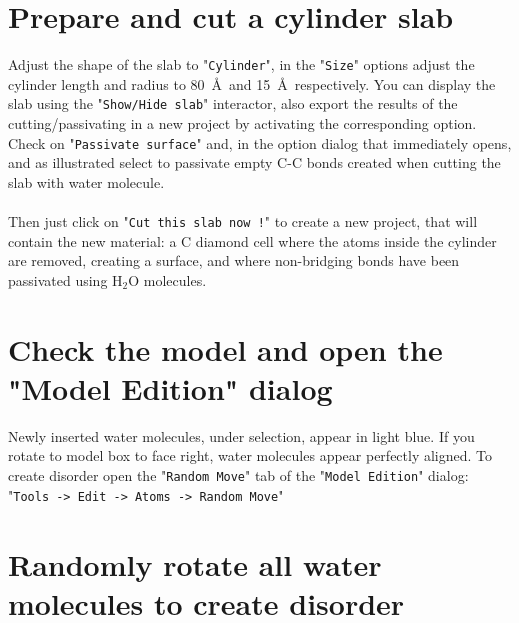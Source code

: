\clearpage

\section{Prepare and cut a cylinder slab}

Adjust the shape of the slab to "\texttt{Cylinder}", in the "\texttt{Size}" options adjust the cylinder length and radius to 80~\AA\ and 15~\AA\ respectively. 
You can display the slab using the "\texttt{Show/Hide~slab}" interactor, also export the results of the cutting/passivating in a new project by activating the corresponding option. \\
Check on "\texttt{Passivate surface}" and, in the option dialog that immediately opens, and as illustrated select to passivate empty C-C bonds created when cutting the slab with water molecule. \\[0.5cm]
\\[0.5cm]
Then just click on "\texttt{Cut~this~slab~now~!}" to create a new project, that will contain the new material: a C diamond cell where the atoms inside the cylinder are removed, creating a surface, and where non-bridging bonds have been passivated using H$_2$O molecules.

\clearpage

\section{Check the model and open the "Model Edition" dialog}

Newly inserted water molecules, under selection, appear in light blue. If you rotate to model box to face right, water molecules appear perfectly aligned. 
To create disorder open the "\texttt{Random~Move}" tab of the "\texttt{Model~Edition}" dialog: "\texttt{Tools~->~Edit~->~Atoms~->~Random~Move}"\\[0.5cm] 

\clearpage

\section{Randomly rotate all water molecules to create disorder}

